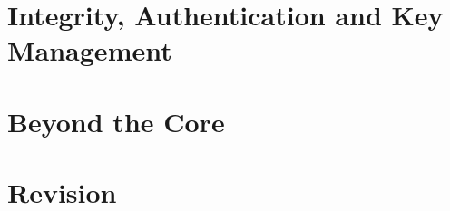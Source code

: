 \documentclass[10pt,a4paper]{article}
\begin{document}
\part{Integrity, Authentication and Key Management}





\part{Beyond the Core}




\part{Revision}

\end{document}
